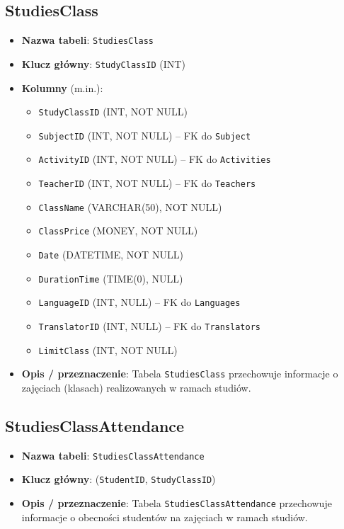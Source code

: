 \documentclass[12pt]{article}
\begin{document}
\subsection{StudiesClass}
\begin{itemize}
    \item \textbf{Nazwa tabeli}: \texttt{StudiesClass}
    \item \textbf{Klucz główny}: \texttt{StudyClassID} (INT)
    \item \textbf{Kolumny} (m.in.):
          \begin{itemize}
            \item \texttt{StudyClassID} (INT, NOT NULL)
            \item \texttt{SubjectID} (INT, NOT NULL) -- FK do \texttt{Subject}
            \item \texttt{ActivityID} (INT, NOT NULL) -- FK do \texttt{Activities}
            \item \texttt{TeacherID} (INT, NOT NULL) -- FK do \texttt{Teachers}
            \item \texttt{ClassName} (VARCHAR(50), NOT NULL)
            \item \texttt{ClassPrice} (MONEY, NOT NULL)
            \item \texttt{Date} (DATETIME, NOT NULL)
            \item \texttt{DurationTime} (TIME(0), NULL)
            \item \texttt{LanguageID} (INT, NULL) -- FK do \texttt{Languages}
            \item \texttt{TranslatorID} (INT, NULL) -- FK do \texttt{Translators}
            \item \texttt{LimitClass} (INT, NOT NULL)
          \end{itemize}
    \item \textbf{Opis / przeznaczenie}:  
         Tabela \texttt{StudiesClass} przechowuje informacje o zajęciach (klasach) realizowanych w ramach studiów.
\end{itemize}

\subsection{StudiesClassAttendance}
\begin{itemize}
    \item \textbf{Nazwa tabeli}: \texttt{StudiesClassAttendance}
    \item \textbf{Klucz główny}: (\texttt{StudentID}, \texttt{StudyClassID})
    \item \textbf{Opis / przeznaczenie}:  
          Tabela \texttt{StudiesClassAttendance} przechowuje informacje o obecności studentów na zajęciach w ramach studiów.
\end{itemize}
\end{document}
